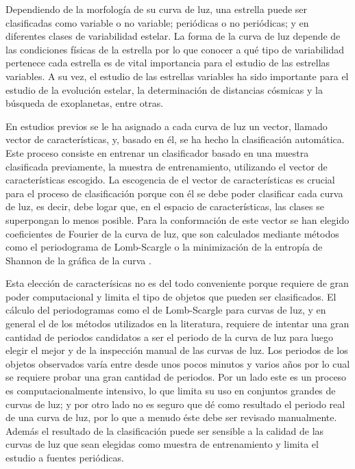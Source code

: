 \documentclass[letterpaper,12pt]{book}
\begin{document}
Dependiendo de la morfología de su curva de luz, una estrella puede ser clasificadas como variable o no variable; periódicas o no periódicas; y en diferentes clases de variabilidad estelar. La forma de la curva de luz depende de las condiciones físicas de la estrella por lo que conocer a qué tipo de variabilidad pertenece cada estrella es de vital importancia para el estudio de las estrellas variables. A su vez, el estudio de las estrellas variables ha sido importante para el estudio de la evolución estelar, la determinación de distancias cósmicas y la búsqueda de exoplanetas, entre otras. 

En estudios previos \cite{debosscher_automated_2007, sarro_automated_2009, richards_machine-learned_2011} se le ha asignado a cada curva de luz un vector, llamado vector de características, y, basado en él, se ha hecho la clasificación automática. Este proceso consiste en entrenar un clasificador basado en una muestra clasificada previamente, la  muestra de entrenamiento, utilizando el vector de características escogido. La escogencia de el vector de características es crucial para el proceso de clasificación porque con él se debe poder clasificar cada curva de luz, es decir, debe logar que, en el espacio de características, las clases se superpongan lo menos posible. Para la conformación de este vector se han elegido coeficientes de Fourier de la curva de luz\cite{debosscher_automated_2007, sarro_automated_2009, richards_machine-learned_2011}, que son calculados mediante métodos como el periodograma de  Lomb-Scargle \cite{scargle_studies_1982} o la minimización de la entropía de Shannon de la gráfica de la curva \cite{cincotta_astronomical_1995}. 

Esta elección de caracterísicas no es del todo conveniente porque requiere de gran poder computacional y limita el tipo de objetos que pueden ser clasificados. El cálculo del periodogramas como el de Lomb-Scargle para curvas de luz, y en general el de los métodos utilizados en la literatura, requiere de intentar una gran cantidad de periodos candidatos a ser el periodo de la curva de luz para luego elegir el mejor y de la inspección manual de las curvas de luz. Los periodos de los objetos observados varía entre desde unos pocos minutos y varios años por lo cual se requiere probar una gran cantidad de periodos. Por un lado este es un proceso es computacionalmente intensivo, lo que limita su uso en conjuntos grandes de curvas de luz; y por otro lado no es seguro que dé como resultado el periodo real de una curva de luz, por lo que a menudo éste debe ser revisado manualmente. Además el resultado de la clasificación puede ser sensible a la calidad de las curvas de luz que sean elegidas como muestra de entrenamiento \cite{debosscher_automated_2007} y limita el estudio a fuentes periódicas. 
\end{document}
